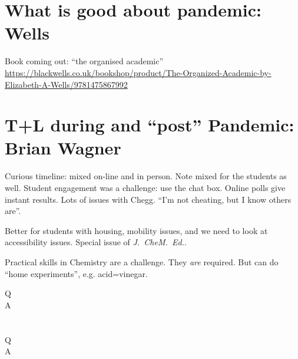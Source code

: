 \documentclass{article}
\begin{document}
\section{What is good about pandemic: Wells}
Book coming out: ``the organised academic'' \url{https://blackwells.co.uk/bookshop/product/The-Organized-Academic-by-Elizabeth-A-Wells/9781475867992}
\section{T+L during and ``post'' Pandemic: Brian Wagner}
Curious timeline: mixed on-line and in person. Note mixed for the students as well. Student engagement was a challenge: use the chat box. Online polls give instant results. Lots of issues with Chegg.  ``I'm not cheating, but I know others are''.
\par
Better for students with housing, mobility issues, and we need to look at accessibility issues. Special issue of \emph{J.~CheM.~Ed.}.
\par
Practical skills in Chemistry are a challenge. They \emph{are} required. But can do ``home experiments'', e.g. acid=vinegar.
\begin{description}
\item[Q]
\item[A]
\end{description}
\section{}

\section{}
\begin{description}
\item[Q]
\item[A]
\end{description}
\begin{description}
\item[]
\end{description}

\end{document}
